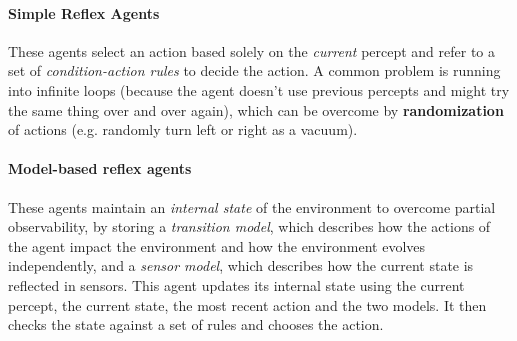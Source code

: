 \paragraph{Simple Reflex Agents} These agents select an action based solely on the \textit{current} percept and refer to a set of \textit{condition-action rules} to decide the action. A common problem is running into infinite loops (because the agent doesn't use previous percepts and might try the same thing over and over again), which can be overcome by \textbf{randomization} of actions (e.g. randomly turn left or right as a vacuum).
 
\paragraph{Model-based reflex agents} These agents maintain an \textit{internal state} of the environment to overcome partial observability, by storing a \textit{transition model}, which describes how the actions of the agent impact the environment and how the environment evolves independently, and a \textit{sensor model}, which describes how the current state is reflected in sensors. This agent updates its internal state using the current percept, the current state, the most recent action and the two models. It then checks the state against a set of rules and chooses the action.





